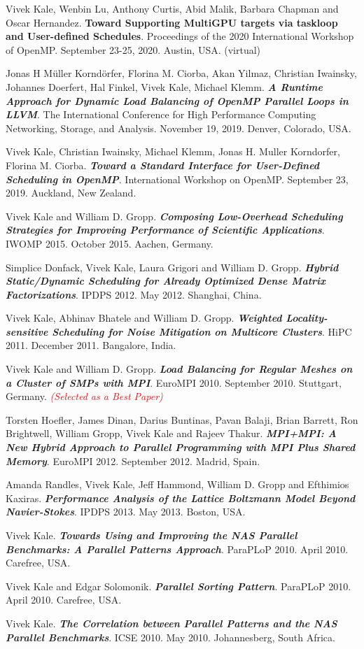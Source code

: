 {\item Vivek Kale, Wenbin Lu, Anthony Curtis, Abid Malik, Barbara Chapman and Oscar Hernandez. \textbf{\textbf{Toward Supporting MultiGPU targets via taskloop and User-defined Schedules}}. Proceedings of the 2020 International Workshop of OpenMP. September 23-25, 2020. Austin, USA. (virtual) 

\item Jonas H Müller Korndörfer, Florina M. Ciorba, Akan Yilmaz, Christian Iwainsky, Johannes Doerfert, Hal Finkel, Vivek Kale, Michael Klemm. \textbf{\textit{A Runtime Approach for Dynamic Load Balancing of OpenMP Parallel Loops in LLVM}}. The International Conference for High Performance Computing Networking, Storage, and Analysis. November 19, 2019. Denver, Colorado, USA.

\item Vivek Kale, Christian Iwainsky, Michael Klemm, Jonas H. Muller Korndorfer, Florina M. Ciorba. \textbf{\textit{Toward a Standard Interface for User-Defined Scheduling in OpenMP}}. International Workshop on OpenMP. September 23, 2019. Auckland, New Zealand. 
\item Vivek Kale and William D. Gropp. \textbf{\textit{Composing Low-Overhead Scheduling Strategies for Improving Performance of Scientific Applications}}. IWOMP 2015. October 2015. Aachen, Germany.
\item Simplice Donfack, Vivek Kale, Laura Grigori and William D. Gropp. \textbf{\textit{Hybrid Static/Dynamic Scheduling for Already Optimized Dense Matrix Factorizations}}. IPDPS 2012. May 2012. Shanghai, China.
\item Vivek Kale, Abhinav Bhatele and William D. Gropp. \textbf{\textit{Weighted Locality-sensitive Scheduling for
      Noise Mitigation on Multicore Clusters}}. HiPC 2011. December
  2011. Bangalore, India. 
\item Vivek Kale and William D. Gropp. \textbf{\textit{Load Balancing for Regular Meshes on a Cluster of SMPs with MPI}}. EuroMPI 2010. September 2010. Stuttgart, Germany. \textit{\textcolor{red}{(Selected as a Best Paper)}}
\item Torsten Hoefler, James Dinan, Darius Buntinas, Pavan Balaji, Brian Barrett, Ron Brightwell, William Gropp, Vivek Kale and Rajeev Thakur. \textbf{\textit{MPI+MPI: A New Hybrid Approach to Parallel Programming with MPI Plus Shared Memory}}. EuroMPI 2012. September 2012. Madrid, Spain.
\item Amanda Randles, Vivek Kale, Jeff Hammond, William D. Gropp and Efthimios Kaxiras. \textbf{\textit{Performance Analysis of the Lattice
Boltzmann Model Beyond Navier-Stokes}}. IPDPS 2013. May 2013. Boston, USA.
\item Vivek Kale. \textbf{\textit{Towards Using and Improving the NAS Parallel Benchmarks: A Parallel Patterns Approach}}. ParaPLoP 2010. April 2010. Carefree, USA.
\item Vivek Kale and Edgar Solomonik. \textbf{\textit{Parallel Sorting Pattern}}. ParaPLoP 2010. April 2010. Carefree, USA. 
\item Vivek Kale. \textbf{\textit{The Correlation between Parallel Patterns and the NAS Parallel Benchmarks}}. ICSE 2010. May 2010. Johannesberg, South Africa.


}


